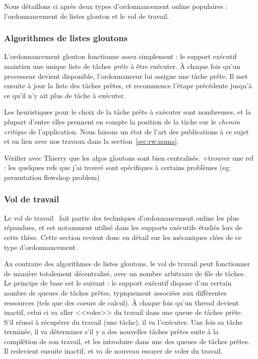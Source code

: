 Nous détaillons ci après deux types d'ordonnancement online populaires : l'ordonnancement de listes glouton et le vol de travail.

\subsubsection{Algorithmes de listes gloutons}

L'ordonnancement glouton fonctionne assez simplement : le support exécutif maintien une unique liste de tâches \emph{prête} à être exécuter.
À chaque fois qu'un processeur devient disponible, l'ordonnanceur lui assigne une tâche prête.
Il met ensuite à jour la liste des tâches prêtes, et recommence l'étape précédente jusqu'à ce qu'il n'y ait plus de tâche à exécuter.

Les heuristiques pour le choix de la tâche prête à exécuter sont nombreuses, et la plupart d'entre elles prennent en compte la position de la tâche sur le \emph{chemin critique} de l'application.
Nous faisons un état de l'art des publications à ce sujet et en lien avec nos travaux dans la section~\ref{sec:rw:numa}.

\begin{todo}
Vérifier avec Thierry que les algos gloutons sont bien centralisés.
+trouver une ref : les quelques refs que j'ai trouvé sont spécifiques à certains problèmes (eg: permutation flowshop problem)

\end{todo}

\subsubsection{Vol de travail}\label{sec:context:runtimes:ws}

Le vol de travail~\cite{Blumofe1999} fait partie des techniques d'ordonnancement online les plus répandues, et est notamment utilisé dans les supports exécutifs étudiés lors de cette thèse.
Cette section revient donc en détail sur les mécaniques clées de ce type d'ordonnancement.

Au contraire des algorithmes de listes gloutons, le vol de travail peut fonctionner de manière totalement décentralisé, avec un nombre arbitraire de file de tâches.
Le principe de base est le suivant : le support exécutif dispose d'un certain nombre de queues de tâches prêtes, typiquement associées aux différentes ressources (tels que des coeurs de calcul).
À chaque fois qu'un thread devient inactif, celui ci va aller <<voler>> du travail dans une queue de tâches prête.
S'il réussi à récupérer du travail (une tâche), il va l'exécuter.
Une fois sa tâche terminée, il va déterminer s'il y a des nouvelles tâches prêtes suite à la complétion de son travail, et les introduire dans une des queues de tâches prêtes.
Il redevient ensuite inactif, et va de nouveau essayer de voler du travail.

